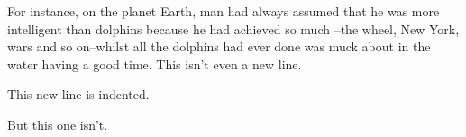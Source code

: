 \documentclass[12pt, twocolumn]{article}
\begin{document}
For instance, on the planet Earth, man had always assumed that 
he was more intelligent than dolphins because he had achieved so much
--the wheel, New York, wars and so on--whilst all the dolphins had 
ever done was muck about in the water having a good time.
This isn't even a new line.  
	
This new line is indented.

But this one isn't.
\end{document}

